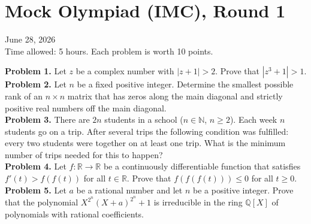 \documentclass{article}
\newcommand{\R}{\mathbb{R}}
\newcommand{\Q}{\mathbb{Q}}
\newcommand{\N}{\mathbb{N}}
\begin{document}
\pagestyle{plain}

\section*{Mock Olympiad (IMC), Round 1}

\begin{center}
June 28, 2026 \\
Time allowed: 5 hours. Each problem is worth 10 points.
\end{center}

\textbf{Problem 1.} %
Let \( z \) be a complex number with \( |z + 1| > 2 \). Prove that \( |z^3 + 1| > 1 \).
\\

\textbf{Problem 2.} %
Let \( n \) be a fixed positive integer. Determine the smallest possible rank of an \( n \times n \) matrix that has zeros along the main diagonal and strictly positive real numbers off the main diagonal.
\\

\textbf{Problem 3.} %
There are \( 2n \) students in a school (\( n \in \N \), \( n \geq 2 \)). Each week \( n \) students go on a trip. After several trips the following condition was fulfilled: every two students were together on at least one trip. What is the minimum number of trips needed for this to happen?
\\

\textbf{Problem 4.} %
Let \( f : \R \to \R \) be a continuously differentiable function that satisfies \( f'(t) > f(f(t)) \) for all \( t \in \R \). Prove that \( f(f(f(t))) \leq 0 \) for all \( t \geq 0 \).
\\

\textbf{Problem 5.} %
Let \( a \) be a rational number and let \( n \) be a positive integer. Prove that the polynomial \( X^{2^n}(X + a)^{2^n} + 1 \) is irreducible in the ring \( \Q[X] \) of polynomials with rational coefficients.
\end{document}
